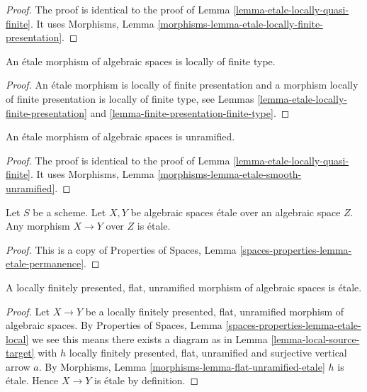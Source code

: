 \begin{proof}
The proof is identical to the proof of
Lemma \ref{lemma-etale-locally-quasi-finite}.
It uses
Morphisms, Lemma \ref{morphisms-lemma-etale-locally-finite-presentation}.
\end{proof}

\begin{lemma}
\label{lemma-etale-locally-finite-type}
An \'etale morphism of algebraic spaces is locally of finite type.
\end{lemma}

\begin{proof}
An \'etale morphism is locally of finite presentation
and a morphism locally of finite presentation is locally of finite type,
see
Lemmas \ref{lemma-etale-locally-finite-presentation} and
\ref{lemma-finite-presentation-finite-type}.
\end{proof}

\begin{lemma}
\label{lemma-etale-unramified}
An \'etale morphism of algebraic spaces is unramified.
\end{lemma}

\begin{proof}
The proof is identical to the proof of
Lemma \ref{lemma-etale-locally-quasi-finite}.
It uses
Morphisms, Lemma \ref{morphisms-lemma-etale-smooth-unramified}.
\end{proof}

\begin{lemma}
\label{lemma-etale-permanence}
Let $S$ be a scheme. Let $X, Y$ be algebraic spaces \'etale over
an algebraic space $Z$. Any morphism $X \to Y$ over $Z$ is \'etale.
\end{lemma}

\begin{proof}
This is a copy of
Properties of Spaces, Lemma \ref{spaces-properties-lemma-etale-permanence}.
\end{proof}

\begin{lemma}
\label{lemma-unramified-flat-lfp-etale}
A locally finitely presented, flat, unramified morphism of algebraic
spaces is \'etale.
\end{lemma}

\begin{proof}
Let $X \to Y$ be a locally finitely presented, flat, unramified morphism
of algebraic spaces. By
Properties of Spaces, Lemma \ref{spaces-properties-lemma-etale-local}
we see this means there exists a diagram as in
Lemma \ref{lemma-local-source-target}
with $h$ locally finitely presented, flat, unramified
and surjective vertical arrow $a$. By
Morphisms, Lemma \ref{morphisms-lemma-flat-unramified-etale}
$h$ is \'etale. Hence $X \to Y$ is \'etale by definition.
\end{proof}






